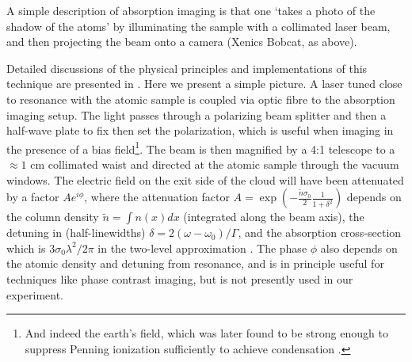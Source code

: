 
	A simple description of absorption imaging is that one `takes a photo of the shadow of the atoms' by illuminating the sample with a collimated laser beam, and then projecting the beam onto a camera (Xenics Bobcat, as above).
	
	Detailed discussions of the physical principles and implementations of this technique are presented in \cite{MakingProbingUnderstanding,TychkovThesis}.
	Here we present a simple picture.
	A laser tuned close to resonance with the atomic sample is coupled via optic fibre to the absorption imaging setup.
	The light passes through a polarizing beam splitter and then a half-wave plate to fix then set the polarization, which is useful when imaging in the presence of a bias field\footnote{And indeed the earth's field, which was later found to be strong enough to suppress Penning ionization sufficiently to achieve condensation \cite{Abbas21}.}.
	The beam is then magnified by a 4:1 telescope to a $\approx1$ cm collimated waist and directed at the atomic sample through the vacuum windows.
	The electric field on the exit side of the cloud will have been attenuated by a factor $Ae^{i\phi}$, where the attenuation factor $A=\exp(-\frac{\tilde{n}\sigma_0}{2}\frac{1}{1+\delta^2})$ depends on the column density  $\tilde{n} = \int n(x) dx$ (integrated along the beam axis), the detuning in (half-linewidths) $\delta=2(\omega-\omega_0)/\Gamma$, and the absorption cross-section which is $3\sigma_0\lambda^2/2\pi$ in the two-level approximation \cite{MakingProbingUnderstanding}.
	The phase $\phi$ also depends on the atomic density and detuning from resonance, and is in principle useful for techniques like phase contrast imaging, but is not presently used in our experiment.

